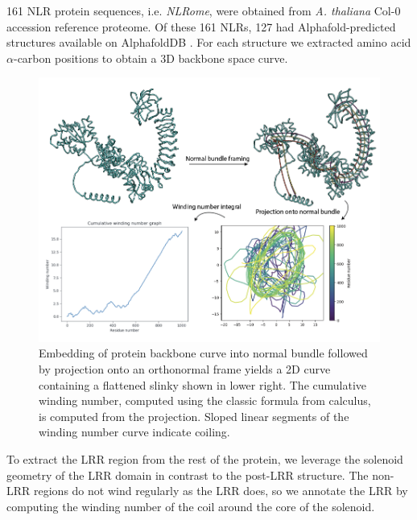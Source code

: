 \documentclass[authoryear]{article}
\begin{document}
161 NLR protein sequences, i.e. \emph{NLRome}, were obtained from \emph{A. thaliana} Col-0 accession reference proteome. Of these 161 NLRs, 127 had Alphafold-predicted structures available on AlphafoldDB \cite{jumper2021highly}\cite{varadi2024alphafold}. For each structure we extracted amino acid $\alpha$-carbon positions to obtain a 3D backbone space curve. 

\begin{figure}[h!]
 \centering
 \includegraphics[width=1.0\textwidth]{winding.png}
 \caption{Embedding of protein backbone curve into normal bundle followed by projection onto an orthonormal frame yields a 2D curve containing a flattened slinky shown in lower right. The cumulative winding number, computed using the classic formula from calculus, is computed from the projection. Sloped linear segments of the winding number curve indicate coiling.}
 \label{fig:postnbarc}
\end{figure}

 
To extract the LRR region from the rest of the protein, we leverage the solenoid geometry of the LRR domain in contrast to the post-LRR structure. The non-LRR regions do not wind regularly as the LRR does, so we annotate the LRR by computing the winding number of the coil around the core of the solenoid. 
\end{document}
